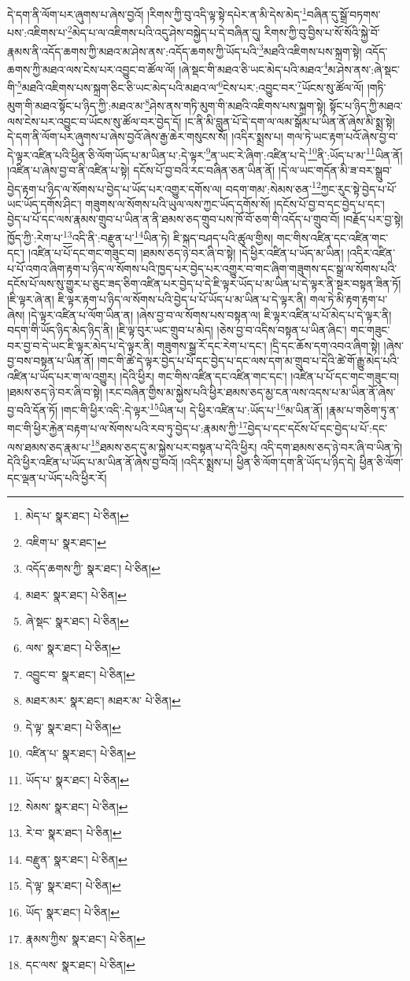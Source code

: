 དེ་དག་ནི་ལོག་པར་ཞུགས་པ་ཞེས་བྱའོ། །རིགས་ཀྱི་བུ་འདི་ལྟ་སྟེ་དཔེར་ན་མི་དེས་མེད་\footnote{མེད་པ་  སྣར་ཐང་།  པེ་ཅིན། }བཞིན་དུ་སྒྲོ་བཏགས་པས་:འཇིགས་པ་\footnote{འཇིག་པ་  སྣར་ཐང་། }མེད་པ་ལ་འཇིགས་པའི་འདུ་ཤེས་བསྐྱེད་པ་དེ་བཞིན་དུ། རིགས་ཀྱི་བུ་བྱིས་པ་སོ་སོའི་སྐྱེ་བོ་རྣམས་ནི་འདོད་ཆགས་ཀྱི་མཐའ་མ་ཤེས་ནས་:འདོད་ཆགས་ཀྱི་ཡོད་པའི་\footnote{འདོད་ཆགས་ཀྱི་  སྣར་ཐང་།  པེ་ཅིན། }མཐའི་འཇིགས་པས་སྐྲག་སྟེ། འདོད་ཆགས་ཀྱི་མཐའ་ལས་ངེས་པར་འབྱུང་བ་ཚོལ་ལོ། །ཞེ་སྡང་གི་མཐའ་ཅི་ཡང་མེད་པའི་མཐའ་\footnote{མཐར་  སྣར་ཐང་།  པེ་ཅིན། }མ་ཤེས་ནས་:ཞེ་སྡང་གི་\footnote{ཞེ་སྡང་  སྣར་ཐང་།  པེ་ཅིན། }མཐའི་འཇིགས་པས་སྐྲག་ཅིང་ཅི་ཡང་མེད་པའི་མཐའ་ལ་\footnote{ལས་  སྣར་ཐང་།  པེ་ཅིན། }ངེས་པར་:འབྱུང་བར་\footnote{འབྱུང་བ་  སྣར་ཐང་།  པེ་ཅིན། }ཡོངས་སུ་ཚོལ་ལོ། །གཏི་མུག་གི་མཐའ་སྟོང་པ་ཉིད་ཀྱི་:མཐའ་མ་\footnote{མཐར་མར་  སྣར་ཐང་། མཐར་མ་  པེ་ཅིན། }ཤེས་ནས་གཏི་མུག་གི་མཐའི་འཇིགས་པས་སྐྲག་སྟེ། སྟོང་པ་ཉིད་ཀྱི་མཐའ་ལས་ངེས་པར་འབྱུང་བ་ཡོངས་སུ་ཚོལ་བར་བྱེད་དོ། །ང་ནི་མི་བླུན་པོ་དེ་དག་ལ་ལམ་སྒོམ་པ་ཡིན་ནོ་ཞེས་མི་སྨྲ་སྟེ། དེ་དག་ནི་ལོག་པར་ཞུགས་པ་ཞེས་བྱའོ་ཞེས་རྒྱ་ཆེར་གསུངས་སོ། །འདིར་སྨྲས་པ། གལ་ཏེ་ཡང་རྟག་པའོ་ཞེས་བྱ་བ་དེ་ལྟར་འཛིན་པའི་ཕྱིན་ཅི་ལོག་ཡོད་པ་མ་ཡིན་པ་:དེ་ལྟར་\footnote{དེ་ལྟ་  སྣར་ཐང་།  པེ་ཅིན། }ན་ཡང་རེ་ཞིག་:འཛིན་པ་དེ་\footnote{འཛིན་པ་  སྣར་ཐང་།  པེ་ཅིན། }ནི་:ཡོད་པ་མ་\footnote{ཡོད་པ་  སྣར་ཐང་།  པེ་ཅིན། }ཡིན་ནོ། །འཛིན་པ་ཞེས་བྱ་བ་ནི་འཛིན་པ་སྟེ། དངོས་པོ་བྱ་བའི་རང་བཞིན་ཅན་ཡིན་ནོ། །དེ་ལ་ཡང་གདོན་མི་ཟ་བར་སྒྲུབ་བྱེད་རྟག་པ་ཉིད་ལ་སོགས་པ་བྱེད་པ་ཡོད་པར་འགྱུར་དགོས་ལ། བདག་གམ་:སེམས་ཅན་\footnote{སེམས་  སྣར་ཐང་།  པེ་ཅིན། }ཀྱང་རུང་སྟེ་བྱེད་པ་པོ་ཡང་ཡོད་དགོས་ཤིང་། གཟུགས་ལ་སོགས་པའི་ཡུལ་ལས་ཀྱང་ཡོད་དགོས་སོ། །དངོས་པོ་བྱ་བ་དང་བྱེད་པ་དང་། བྱེད་པ་པོ་དང་ལས་རྣམས་གྲུབ་པ་ཡིན་ན་ནི་ཐམས་ཅད་གྲུབ་པས་ཁོ་བོ་ཅག་གི་འདོད་པ་གྲུབ་བོ། །བརྗོད་པར་བྱ་སྟེ། ཁྱོད་ཀྱི་:རེག་པ་\footnote{རེ་བ་  སྣར་ཐང་།  པེ་ཅིན། }འདི་ནི་:བརྫུན་པ་\footnote{བརྫུན་  སྣར་ཐང་།  པེ་ཅིན། }ཡིན་ཏེ། ཇི་སྐད་བཤད་པའི་ཚུལ་གྱིས། གང་གིས་འཛིན་དང་འཛིན་གང་དང་། །འཛིན་པ་པོ་དང་གང་གཟུང་བ། །ཐམས་ཅད་ཉེ་བར་ཞི་བ་སྟེ། །དེ་ཕྱིར་འཛིན་པ་ཡོད་མ་ཡིན། །འདིར་འཛིན་པ་པོ་འགའ་ཞིག་རྟག་པ་ཉིད་ལ་སོགས་པའི་ཁྱད་པར་བྱེད་པར་འགྱུར་བ་གང་ཞིག་གཟུགས་དང་སྒྲ་ལ་སོགས་པའི་དངོས་པོ་ལས་སུ་གྱུར་པ་ཅུང་ཟད་ཅིག་འཛིན་པར་བྱེད་པ་དེ་ཇི་ལྟར་ཡོད་པ་མ་ཡིན་པ་དེ་ལྟར་ནི་སྔར་བསྟན་ཟིན་ཏོ། །ཇི་ལྟར་ཞེ་ན། ཇི་ལྟར་རྟག་པ་ཉིད་ལ་སོགས་པའི་བྱེད་པ་པོ་ཡོད་པ་མ་ཡིན་པ་དེ་ལྟར་ནི། གལ་ཏེ་མི་རྟག་རྟག་པ་ཞེས། །དེ་ལྟར་འཛིན་པ་ལོག་ཡིན་ན། །ཞེས་བྱ་བ་ལ་སོགས་པས་བསྟན་ལ། ཇི་ལྟར་འཛིན་པ་པོ་མེད་པ་དེ་ལྟར་ནི། བདག་གི་ཡོད་ཉིད་མེད་ཉིད་ནི། །ཇི་ལྟ་བུར་ཡང་གྲུབ་པ་མེད། །ཅེས་བྱ་བ་འདིས་བསྟན་པ་ཡིན་ཞིང་། གང་གཟུང་བར་བྱ་བ་དེ་ཡང་ཇི་ལྟར་མེད་པ་དེ་ལྟར་ནི། གཟུགས་སྒྲ་རོ་དང་རེག་པ་དང་། །དྲི་དང་ཆོས་དག་འབའ་ཞིག་སྟེ། །ཞེས་བྱ་བས་བསྟན་པ་ཡིན་ནོ། །གང་གི་ཚེ་དེ་ལྟར་བྱེད་པ་པོ་དང་བྱེད་པ་དང་ལས་དག་མ་གྲུབ་པ་དེའི་ཚེ་གོ་རྒྱུ་མེད་པའི་འཛིན་པ་ཡོད་པར་ག་ལ་འགྱུར། །དེའི་ཕྱིར། གང་གིས་འཛིན་དང་འཛིན་གང་དང་། །འཛིན་པ་པོ་དང་གང་གཟུང་བ། །ཐམས་ཅད་ཉེ་བར་ཞི་བ་སྟེ། །རང་བཞིན་གྱིས་མ་སྐྱེས་པའི་ཕྱིར་ཐམས་ཅད་མྱ་ངན་ལས་འདས་པ་མ་ཡིན་ནོ་ཞེས་བྱ་བའི་དོན་ཏོ། །གང་གི་ཕྱིར་འདི་:དེ་ལྟར་\footnote{དེ་ལྟ་  སྣར་ཐང་།  པེ་ཅིན། }ཡིན་པ། དེ་ཕྱིར་འཛིན་པ་:ཡོད་པ་\footnote{ཡོད་  སྣར་ཐང་།  པེ་ཅིན། }མ་ཡིན་ནོ། །རྣམ་པ་གཅིག་ཏུ་ན་གང་གི་ཕྱིར་རྐྱེན་བརྟག་པ་ལ་སོགས་པའི་རབ་ཏུ་བྱེད་པ་:རྣམས་ཀྱི་\footnote{རྣམས་ཀྱིས་  སྣར་ཐང་།  པེ་ཅིན། }བྱེད་པ་དང་དངོས་པོ་དང་བྱེད་པ་པོ་:དང་ལས་ཐམས་ཅད་རྣམ་པ་\footnote{དང་ལས་  སྣར་ཐང་།  པེ་ཅིན། }ཐམས་ཅད་དུ་མ་སྐྱེས་པར་བསྟན་པ་དེའི་ཕྱིར། འདི་དག་ཐམས་ཅད་ཉེ་བར་ཞི་བ་ཡིན་ཏེ། དེའི་ཕྱིར་འཛིན་པ་ཡོད་པ་མ་ཡིན་ནོ་ཞེས་བྱ་བའོ། །འདིར་སྨྲས་པ། ཕྱིན་ཅི་ལོག་དག་ནི་ཡོད་པ་ཉིད་དེ། ཕྱིན་ཅི་ལོག་དང་ལྡན་པ་ཡོད་པའི་ཕྱིར་རོ། 